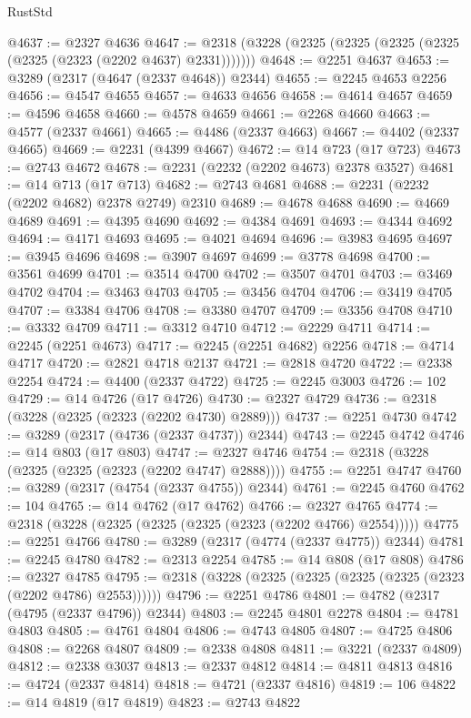 \begin{lexlean}{RustStd}
\begin{coremodule}
@4637 := @2327 @4636
@4647 := @2318 (@3228 (@2325 (@2325 (@2325 (@2325 (@2325 (@2323 (@2202 @4637) @2331)))))))
@4648 := @2251 @4637
@4653 := @3289 (@2317 (@4647 (@2337 @4648)) @2344)
@4655 := @2245 @4653 @2256
@4656 := @4547 @4655
@4657 := @4633 @4656
@4658 := @4614 @4657
@4659 := @4596 @4658
@4660 := @4578 @4659
@4661 := @2268 @4660
@4663 := @4577 (@2337 @4661)
@4665 := @4486 (@2337 @4663)
@4667 := @4402 (@2337 @4665)
@4669 := @2231 (@4399 @4667)
@4672 := @14 @723 (@17 @723)
@4673 := @2743 @4672
@4678 := @2231 (@2232 (@2202 @4673) @2378 @3527)
@4681 := @14 @713 (@17 @713)
@4682 := @2743 @4681
@4688 := @2231 (@2232 (@2202 @4682) @2378 @2749) @2310
@4689 := @4678 @4688
@4690 := @4669 @4689
@4691 := @4395 @4690
@4692 := @4384 @4691
@4693 := @4344 @4692
@4694 := @4171 @4693
@4695 := @4021 @4694
@4696 := @3983 @4695
@4697 := @3945 @4696
@4698 := @3907 @4697
@4699 := @3778 @4698
@4700 := @3561 @4699
@4701 := @3514 @4700
@4702 := @3507 @4701
@4703 := @3469 @4702
@4704 := @3463 @4703
@4705 := @3456 @4704
@4706 := @3419 @4705
@4707 := @3384 @4706
@4708 := @3380 @4707
@4709 := @3356 @4708
@4710 := @3332 @4709
@4711 := @3312 @4710
@4712 := @2229 @4711
@4714 := @2245 (@2251 @4673)
@4717 := @2245 (@2251 @4682) @2256
@4718 := @4714 @4717
@4720 := @2821 @4718 @2137
@4721 := @2818 @4720
@4722 := @2338 @2254
@4724 := @4400 (@2337 @4722)
@4725 := @2245 @3003
@4726 := 102
@4729 := @14 @4726 (@17 @4726)
@4730 := @2327 @4729
@4736 := @2318 (@3228 (@2325 (@2323 (@2202 @4730) @2889)))
@4737 := @2251 @4730
@4742 := @3289 (@2317 (@4736 (@2337 @4737)) @2344)
@4743 := @2245 @4742
@4746 := @14 @803 (@17 @803)
@4747 := @2327 @4746
@4754 := @2318 (@3228 (@2325 (@2325 (@2323 (@2202 @4747) @2888))))
@4755 := @2251 @4747
@4760 := @3289 (@2317 (@4754 (@2337 @4755)) @2344)
@4761 := @2245 @4760
@4762 := 104
@4765 := @14 @4762 (@17 @4762)
@4766 := @2327 @4765
@4774 := @2318 (@3228 (@2325 (@2325 (@2325 (@2323 (@2202 @4766) @2554)))))
@4775 := @2251 @4766
@4780 := @3289 (@2317 (@4774 (@2337 @4775)) @2344)
@4781 := @2245 @4780
@4782 := @2313 @2254
@4785 := @14 @808 (@17 @808)
@4786 := @2327 @4785
@4795 := @2318 (@3228 (@2325 (@2325 (@2325 (@2325 (@2323 (@2202 @4786) @2553))))))
@4796 := @2251 @4786
@4801 := @4782 (@2317 (@4795 (@2337 @4796)) @2344)
@4803 := @2245 @4801 @2278
@4804 := @4781 @4803
@4805 := @4761 @4804
@4806 := @4743 @4805
@4807 := @4725 @4806
@4808 := @2268 @4807
@4809 := @2338 @4808
@4811 := @3221 (@2337 @4809)
@4812 := @2338 @3037
@4813 := @2337 @4812
@4814 := @4811 @4813
@4816 := @4724 (@2337 @4814)
@4818 := @4721 (@2337 @4816)
@4819 := 106
@4822 := @14 @4819 (@17 @4819)
@4823 := @2743 @4822

\end{coremodule}
\end{lexlean}
